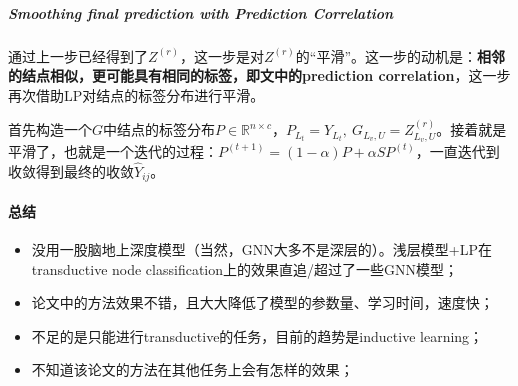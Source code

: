 \subparagraph{Smoothing final prediction with Prediction Correlation}
通过上一步已经得到了$Z^{(r)}$，这一步是对$Z^{(r)}$的“平滑”。这一步的动机是：\textbf{相邻的结点相似，更可能具有相同的标签，即文中的prediction correlation}，这一步再次借助LP对结点的标签分布进行平滑。

首先构造一个$G$中结点的标签分布$P \in \mathbb{R}^{n \times c}$，$P_{L_t} = Y_{L_t},\: G_{L_v, U} = Z^{(r)}_{L_v, U}$。接着就是平滑了，也就是一个迭代的过程：$P^{(t+1)} = (1-\alpha)P + \alpha SP^{(t)}$，一直迭代到收敛得到最终的收敛$\hat{Y}_{ij}$。

\paragraph{总结}

\begin{itemize}

	\item 没用一股脑地上深度模型（当然，GNN大多不是深层的）。浅层模型+LP在transductive node classification上的效果直追/超过了一些GNN模型；
	\item 论文中的方法效果不错，且大大降低了模型的参数量、学习时间，速度快；
	\item 不足的是只能进行transductive的任务，目前的趋势是inductive learning；
	\item 不知道该论文的方法在其他任务上会有怎样的效果；

\end{itemize}

